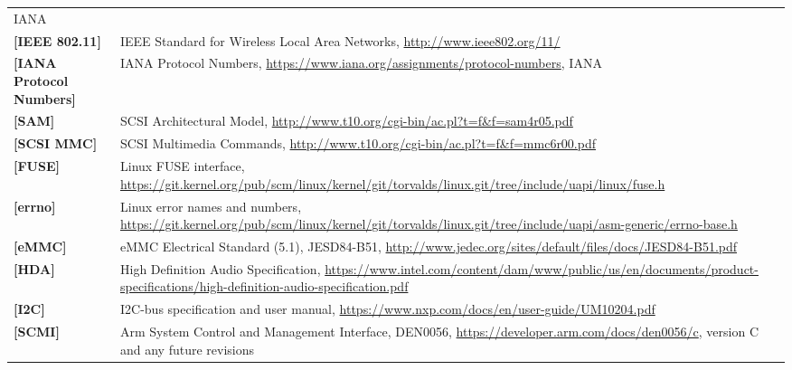 \begin{longtable}{l p{5in}}
	IANA\\
	\label{intro:IEEE 802.11}\textbf{[IEEE 802.11]} &
	IEEE Standard for Wireless Local Area Networks,
	\newline\url{http://www.ieee802.org/11/}\\
	\label{intro:IANA Protocol Numbers}\textbf{[IANA Protocol Numbers]} &
	IANA Protocol Numbers,
	\newline\url{https://www.iana.org/assignments/protocol-numbers},
	IANA\\
	\label{intro:SAM}\textbf{[SAM]} &
        SCSI Architectural Model,
        \newline\url{http://www.t10.org/cgi-bin/ac.pl?t=f&f=sam4r05.pdf}\\
	\label{intro:SCSI MMC}\textbf{[SCSI MMC]} &
        SCSI Multimedia Commands,
        \newline\url{http://www.t10.org/cgi-bin/ac.pl?t=f&f=mmc6r00.pdf}\\
	\label{intro:FUSE}\textbf{[FUSE]} &
	Linux FUSE interface,
	\newline\url{https://git.kernel.org/pub/scm/linux/kernel/git/torvalds/linux.git/tree/include/uapi/linux/fuse.h}\\
	\label{intro:errno}\textbf{[errno]} &
	Linux error names and numbers,
	\newline\url{https://git.kernel.org/pub/scm/linux/kernel/git/torvalds/linux.git/tree/include/uapi/asm-generic/errno-base.h}\\
        \label{intro:eMMC}\textbf{[eMMC]} &
        eMMC Electrical Standard (5.1), JESD84-B51,
        \newline\url{http://www.jedec.org/sites/default/files/docs/JESD84-B51.pdf}\\
	\label{intro:HDA}\textbf{[HDA]} &
	High Definition Audio Specification,
	\newline\url{https://www.intel.com/content/dam/www/public/us/en/documents/product-specifications/high-definition-audio-specification.pdf}\\
	\label{intro:I2C}\textbf{[I2C]} &
	I2C-bus specification and user manual,
	\newline\url{https://www.nxp.com/docs/en/user-guide/UM10204.pdf}\\
	\label{intro:SCMI}\textbf{[SCMI]} &
	Arm System Control and Management Interface, DEN0056,
	\newline\url{https://developer.arm.com/docs/den0056/c}, version C and any future revisions\\

\end{longtable}
